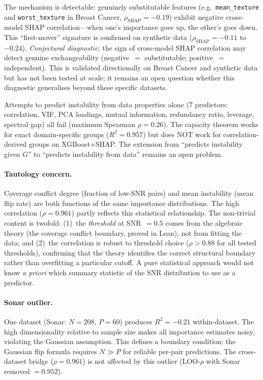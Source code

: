 \documentclass[11pt,a4paper]{article}
\begin{document}
The mechanism is detectable: genuinely substitutable features (e.g.\ \texttt{mean\_texture} and \texttt{worst\_texture} in Breast Cancer, $\rho_{\mathrm{SHAP}} = -0.19$) exhibit negative cross-model SHAP correlation---when one's importance goes up, the other's goes down.  This ``first-mover'' signature is confirmed on synthetic data ($\rho_{\mathrm{SHAP}} = -0.11$ to $-0.24$).  \emph{Conjectural diagnostic:} the sign of cross-model SHAP correlation may detect genuine exchangeability (negative~$=$ substitutable; positive~$=$ independent).  This is validated directionally on Breast Cancer and synthetic data but has not been tested at scale; it remains an open question whether this diagnostic generalises beyond these specific datasets.

Attempts to predict instability from data properties alone (7 predictors: correlation, VIF, PCA loadings, mutual information, redundancy ratio, leverage, spectral gap) all fail (maximum Spearman $\rho = 0.26$).  The capacity theorem works for exact domain-specific groups ($R^2 = 0.957$) but does NOT work for correlation-derived groups on XGBoost+SHAP.  The extension from ``predicts instability given $G$'' to ``predicts instability from data'' remains an open problem.

\paragraph{Tautology concern.}  Coverage conflict degree (fraction of low-SNR pairs) and mean instability (mean flip rate) are both functions of the same importance distributions.  The high correlation ($\rho = 0.961$) partly reflects this statistical relationship.  The non-trivial content is twofold: (1)~the \emph{threshold} at SNR~$= 0.5$ comes from the algebraic theory (the coverage conflict boundary, proved in Lean), not from fitting the data; and (2)~the correlation is robust to threshold choice ($\rho > 0.88$ for all tested thresholds), confirming that the theory identifies the correct structural boundary rather than overfitting a particular cutoff.  A pure statistical approach would not know \emph{a priori} which summary statistic of the SNR distribution to use as a predictor.

\paragraph{Sonar outlier.}  One dataset (Sonar: $N = 208$, $P = 60$) produces $R^2 = -0.21$ within-dataset.  The high dimensionality relative to sample size makes all importance estimates noisy, violating the Gaussian assumption.  This defines a boundary condition: the Gaussian flip formula requires $N \gg P$ for reliable per-pair predictions.  The cross-dataset bridge ($\rho = 0.961$) is not affected by this outlier (LOO-$\rho$ with Sonar removed $= 0.952$).
\end{document}
